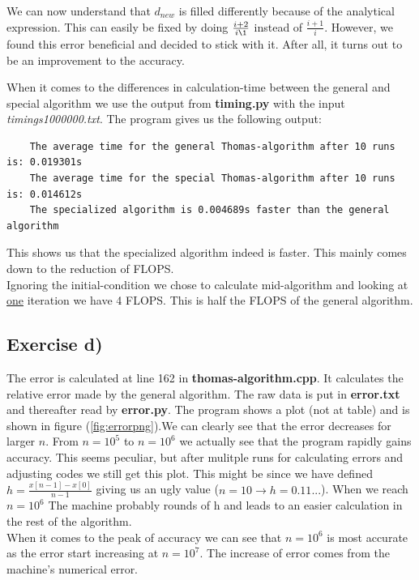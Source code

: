 \documentclass{article}
\begin{document}
  We can now understand that $d_{new}$ is filled differently because of the analytical expression. This can easily be fixed by doing $\frac{i+2}{i\1}$ instead of $\frac{i+1}{i}$. However, we found this error beneficial and decided to stick with it. After all, it turns out to be an improvement to the accuracy.

  When it comes to the differences in calculation-time between the general and special algorithm we use the output from \textbf{timing.py} with the input \textit{timings1000000.txt}. The program gives us the following output:

  \begin{verbatim}
    The average time for the general Thomas-algorithm after 10 runs is: 0.019301s
    The average time for the special Thomas-algorithm after 10 runs is: 0.014612s
    The specialized algorithm is 0.004689s faster than the general algorithm
  \end{verbatim}

  This shows us that the specialized algorithm indeed is faster. This mainly comes down to the reduction of FLOPS.\\
  Ignoring the initial-condition we chose to calculate mid-algorithm and looking at \underline{one} iteration we have 4 FLOPS. This is half the FLOPS of the general algorithm.

  \subsection{Exercise d)} \label{Results d)}

  The error is calculated at line 162 in \textbf{thomas-algorithm.cpp}. It calculates the relative error made by the general algorithm. The raw data is put in \textbf{error.txt} and thereafter read by \textbf{error.py}. The program shows a plot (not at table) and is shown in figure (\ref{fig:errorpng}).We can clearly see that the error decreases for larger $n$. From $n=10^5$ to $n=10^6$ we actually see that the program rapidly gains accuracy. This seems peculiar, but after mulitple runs for calculating errors and adjusting codes we still get this plot. This might be since we have defined $h=\frac{x[n-1]-x[0]}{n-1}$ giving us an ugly value ($n=10 \rightarrow{} h=0.11...$). When we reach $n=10^6$ The machine probably rounds of h and leads to an easier calculation in the rest of the algorithm.\\
  When it comes to the peak of accuracy we can see that $n=10^6$ is most accurate as the error start increasing at $n=10^7$. The increase of error comes from the machine's numerical error.
\end{document}
